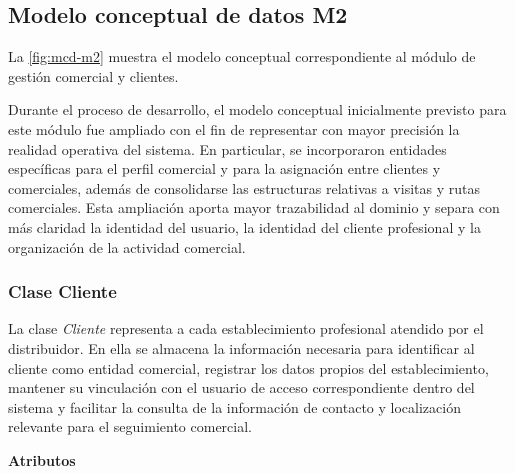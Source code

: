 \subsection{Modelo conceptual de datos M2}

La \autoref{fig:mcd-m2} muestra el modelo conceptual correspondiente al módulo de gestión comercial y clientes.


Durante el proceso de desarrollo, el modelo conceptual inicialmente previsto para este módulo fue ampliado con el fin de representar con mayor precisión la realidad operativa del sistema. En particular, se incorporaron entidades específicas para el perfil comercial y para la asignación entre clientes y comerciales, además de consolidarse las estructuras relativas a visitas y rutas comerciales. Esta ampliación aporta mayor trazabilidad al dominio y separa con más claridad la identidad del usuario, la identidad del cliente profesional y la organización de la actividad comercial.

\subsubsection{Clase Cliente}

La clase \textit{Cliente} representa a cada establecimiento profesional atendido por el distribuidor. En ella se almacena la información necesaria para identificar al cliente como entidad comercial, registrar los datos propios del establecimiento, mantener su vinculación con el usuario de acceso correspondiente dentro del sistema y facilitar la consulta de la información de contacto y localización relevante para el seguimiento comercial.

\textbf{Atributos}

